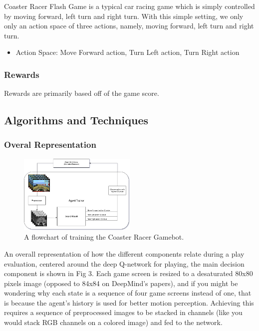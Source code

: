 \documentclass[a4paper]{article}
\begin{document}
Coaster Racer Flash Game is a typical car racing game which is simply controlled by moving forward, left turn and right turn. With this simple setting, we only only an action space of three actions, namely, moving forward, left turn and right turn.

\begin{itemize}
	
	\item Action Space: {Move Forward action, Turn Left action, Turn Right action}

\end{itemize}

\subsubsection{Rewards}

Rewards are primarily based off of the game score.

\subsection{Algorithms and Techniques}

\subsubsection{Overal Representation}

\begin{figure}[h]
\centering
\includegraphics[width=0.5\textwidth]{implementation}
\caption{A flowchart of training the Coaster Racer Gamebot.}
\end{figure}

An overall representation of how the different components relate during a play evaluation, centered around the deep Q-network for playing, the main decision component is shown in Fig 3. Each game screen is resized to a desaturated 80x80 pixels image (opposed to 84x84 on DeepMind's papers), and if you might be wondering why each state is a sequence of four game screens instead of one, that is because the agent's history is used for better motion perception. Achieving this requires a sequence of preprocessed images to be stacked in channels (like you would stack RGB channels on a colored image) and fed to the network.
\end{document}
